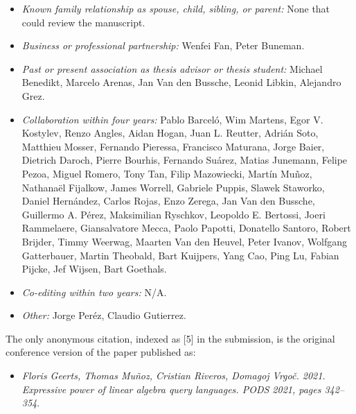 \documentclass[11pt]{letter}
\begin{document}
\begin{itemize}\itemsep=-1pt
\item {\em Known family relationship as spouse, child, sibling, or parent:} None that could review the manuscript.
\item {\em Business or professional partnership:} Wenfei Fan, Peter Buneman.
\item {\em Past or present association as thesis advisor or thesis student:} Michael Benedikt, Marcelo Arenas, Jan Van den Bussche, Leonid Libkin, Alejandro Grez.
\item {\em Collaboration within four years:} Pablo Barcel\'o, Wim Martens, Egor V. Kostylev, Renzo Angles, Aidan Hogan, Juan L. Reutter, Adri\'an Soto, Matthieu Mosser, Fernando Pieressa, Francisco Maturana, Jorge Baier, Dietrich Daroch, Pierre Bourhis, Fernando Su\'arez, Matias Junemann, Felipe Pezoa, Miguel Romero, Tony Tan, Filip Mazowiecki, Mart\'in Mu\~noz, Nathana\"el Fijalkow, James Worrell, Gabriele Puppis,  Slawek Staworko, Daniel Hern\'andez, Carlos Rojas, Enzo Zerega,  Jan Van den Bussche, Guillermo A. P\'erez, Maksimilian Ryschkov, Leopoldo E. Bertossi, Joeri Rammelaere, Giansalvatore Mecca, Paolo Papotti, Donatello Santoro, Robert Brijder, Timmy Weerwag, Maarten Van den Heuvel, Peter Ivanov, Wolfgang Gatterbauer, Martin Theobald, Bart Kuijpers, Yang Cao, Ping Lu, Fabian Pijcke, Jef Wijsen, Bart Goethals.
\item {\em Co-editing within two years:} N/A.
\item {\em Other:} Jorge Per\'ez, Claudio Gutierrez.
\end{itemize}

\medskip

 The only anonymous citation, indexed as [5] in the submission, is the original conference version of the paper published as:
\begin{itemize}
\item {\em Floris Geerts, Thomas Mu\~noz, Cristian Riveros,  Domagoj Vrgo\v{c}. 2021. 
Expressive power of linear algebra query languages. PODS 2021, pages 342--354}.
\end{itemize}
\end{document}
